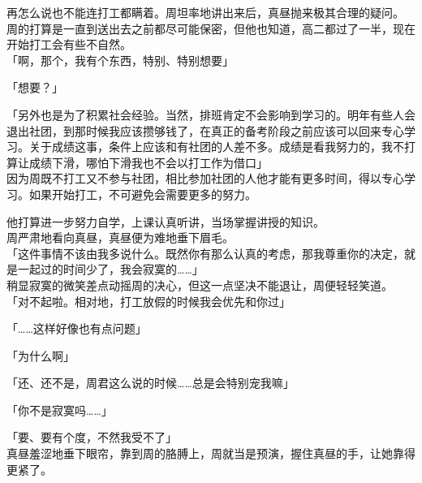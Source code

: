 再怎么说也不能连打工都瞒着。周坦率地讲出来后，真昼抛来极其合理的疑问。\\

周的打算是一直到送出去之前都尽可能保密，但他也知道，高二都过了一半，现在开始打工会有些不自然。\\

「啊，那个，我有个东西，特别、特别想要」

「想要？」

「另外也是为了积累社会经验。当然，排班肯定不会影响到学习的。明年有些人会退出社团，到那时候我应该攒够钱了，在真正的备考阶段之前应该可以回来专心学习。关于成绩这事，条件上应该和有社团的人差不多。成绩是看我努力的，我不打算让成绩下滑，哪怕下滑我也不会以打工作为借口」\\

因为周既不打工又不参与社团，相比参加社团的人他才能有更多时间，得以专心学习。如果开始打工，不可避免会需要更多的努力。

他打算进一步努力自学，上课认真听讲，当场掌握讲授的知识。\\

周严肃地看向真昼，真昼便为难地垂下眉毛。\\

「这件事情不该由我多说什么。既然你有那么认真的考虑，那我尊重你的决定，就是一起过的时间少了，我会寂寞的……」\\

稍显寂寞的微笑差点动摇周的决心，但这一点坚决不能退让，周便轻轻笑道。\\

「对不起啦。相对地，打工放假的时候我会优先和你过」

「……这样好像也有点问题」

「为什么啊」

「还、还不是，周君这么说的时候……总是会特别宠我嘛」

「你不是寂寞吗……」

「要、要有个度，不然我受不了」\\

真昼羞涩地垂下眼帘，靠到周的胳膊上，周就当是预演，握住真昼的手，让她靠得更紧了。
